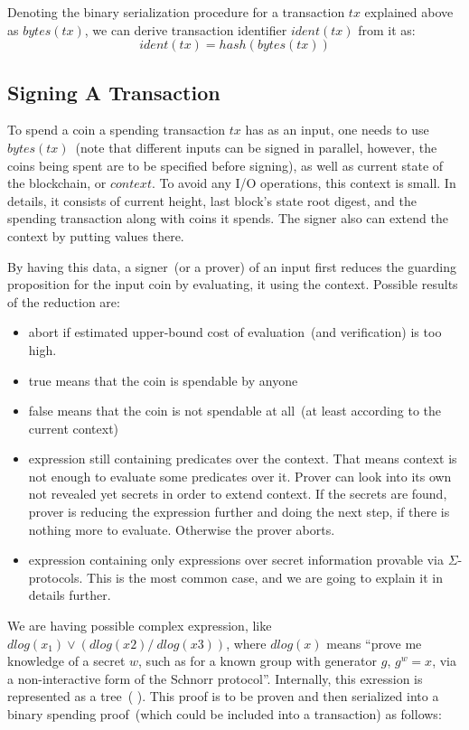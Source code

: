 \documentclass[]{article}   %
\newcommand{\authnote}[2]{\marginpar{\parbox{\marginparwidth}{\tiny %
  \textsf{#1 {\textcolor{blue}{notes: #2}}}}}%
  \textcolor{blue}{\textbf{\dag}}}
\newcommand{\authnote}[2]{
  \textsf{#1 \textcolor{blue}{: #2}}}
\newcommand{\authnote}[2]{}
\newcommand{\knote}[1]{{\authnote{\textcolor{green}{Alex notes}}{#1}}}
\newcommand{\coin}{coin}
\begin{document}
Denoting the binary serialization procedure for a transaction $tx$ explained above as $bytes(tx)$, we can derive
transaction identifier $ident(tx)$ from it as:
    $$ident(tx) = hash(bytes(tx))$$

\subsection{Signing A Transaction}

To spend a \coin{} a spending transaction $tx$ has as an input, one needs to use $bytes(tx)$~(note that different inputs
can be signed in parallel, however, the coins being spent are to be specified before signing), as well as current state
of the blockchain, or $context$. To avoid any I/O operations, this context is small. In details, it consists of current
height, last block's state root digest, and the spending transaction along with \coin{}s it spends. The signer also can
extend the context by putting values there.

By having this data, a signer~(or a prover) of an input first reduces the guarding proposition for the input \coin{} by
evaluating, it using the context. Possible results of the reduction are:

\begin{itemize}
    \item{abort} if estimated upper-bound cost of evaluation~(and verification) is too high.
    \item{true} means that the \coin{} is spendable by anyone
    \item{false} means that the \coin{} is not spendable at all~(at least according to the current context)
    \item{expression still containing predicates over the context. } That means context is not enough to evaluate
    some predicates over it. Prover can look into its own not revealed yet secrets in order to extend context. If the
    secrets are found, prover is reducing the expression further and doing the next step, if there is nothing more to
    evaluate. Otherwise the prover aborts.
    \item{expression containing only expressions over secret information provable via $\Sigma$-protocols. } This is the
    most common case, and we are going to explain it in details further.
\end{itemize}

We are having possible complex expression, like $dlog(x_1) \lor (dlog(x2) /\ dlog(x3))$, where $dlog(x)$ means ``prove me
knowledge of a secret $w$, such as for a known group with generator $g$, $g^w = x$, via a non-interactive form of the
Schnorr protocol''. Internally, this exression is represented as a tree~(\knote{draw the tree}). This proof is to be
proven and then serialized into a binary spending proof~(which could be included into a transaction) as follows:
\end{document}
